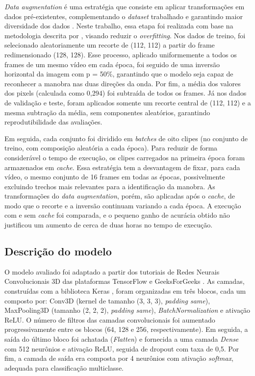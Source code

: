 \documentclass[12pt,a4paper, brazilian]{article}
\begin{document}
{{\textit{Data augmentation} é uma estratégia que consiste em aplicar transformações em dados pré-existentes, complementando o \textit{ \textit{dataset} } trabalhado e garantindo maior diversidade dos dados \cite{murel2024dataaugmentation}. Neste trabalho, essa etapa foi realizada com base na metodologia descrita por \textcite{KarpathyCVPR14}, visando reduzir o \textit{overfitting}. Nos dados de treino, foi selecionado aleatoriamente um recorte de (112, 112) a partir do frame redimensionado (128, 128). Esse processo, aplicado uniformemente a todos os frames de um mesmo vídeo em cada época, foi seguido de uma inversão horizontal da imagem com p = 50\%, garantindo que o modelo seja capaz de reconhecer a manobra nas duas direções da onda. Por fim, a média dos valores dos pixels (calculada como 0,294) foi subtraída de todos os frames. Já nos dados de validação e teste, foram aplicados somente um recorte central de (112, 112) e a mesma subtração da média, sem componentes aleatórios, garantindo reprodutibilidade das avaliações.

Em seguida, cada conjunto foi dividido em \textit{batches} de oito clipes (no conjunto de treino, com composição aleatória a cada época). Para reduzir de forma considerável o tempo de execução, os clipes carregados na primeira época foram armazenados em \textit{cache}. Essa estratégia tem a desvantagem de fixar, para cada vídeo, o mesmo conjunto de 16 frames em todas as épocas, possivelmente excluindo trechos mais relevantes para a identificação da manobra. As transformações do \textit{data augmentation}, porém, são aplicadas após o \textit{cache}, de modo que o recorte e a inversão continuam variando a cada época. A execução com e sem \textit{cache} foi comparada, e o pequeno ganho de acurácia obtido não justificou um aumento de cerca de duas horas no tempo de execução.

\subsection{Descrição do modelo}

O modelo avaliado foi adaptado a partir dos tutoriais de Redes Neurais Convolucionais 3D das plataformas TensorFlow \cite{tensorflowVideoClassification} e GeeksForGeeks \cite{geeksforgeeksVideoClassification}. As camadas, construídas com a biblioteca Keras \cite{chollet2015keras}, foram organizadas em três blocos, cada um composto por: Conv3D (kernel de tamanho (3, 3, 3), \textit{padding same}), MaxPooling3D (tamanho (2, 2, 2), \textit{padding same}),  \textit{BatchNormalization} e ativação ReLU. O número de filtros das camadas convolucionais foi aumentado progressivamente entre os blocos (64, 128 e 256, respectivamente). Em seguida, a saída do último bloco foi achatada (\textit{Flatten}) e fornecida a uma camada \textit{Dense} com 512 neurônios e ativação ReLU, seguida de dropout com taxa de 0,5. Por fim, a camada de saída era composta por 4 neurônios com ativação \textit{softmax}, adequada para classificação multiclasse.

}}
\end{document}

